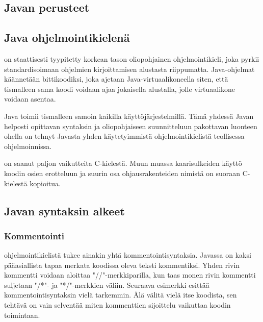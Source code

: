 \documentclass[a4paper,justified,notoc]{tufte-book}
\begin{document}
\begin{fullwidth}

\chapter{Javan perusteet}
\label{perusteet}	

\section{Java ohjelmointikielenä}
\label{javasta}

 on staattisesti tyypitetty korkean tason oliopohjainen ohjelmointikieli, joka
pyrkii standardisoimaan ohjelmien kirjoittamisen alustasta riippumatta. Java-ohjelmat käännetään
bittikoodiksi, joka ajetaan Java-virtuaalikoneella siten, että tismalleen sama koodi voidaan ajaa
jokaisella alustalla, jolle virtuaalikone voidaan asentaa.

 Java toimii tismalleen samoin kaikilla käyttöjärjestelmillä. Tämä
yhdessä Javan helposti opittavan syntaksin ja oliopohjaiseen suunnitteluun pakottavan luonteen
ohella on tehnyt Javasta yhden käytetyimmistä ohjelmointikielistä teollisessa ohjelmoinnissa.

 on saanut paljon vaikutteita C-kielestä. Muun muassa kaarisulkeiden
käyttö koodin osien erotteluun ja suurin osa ohjausrakenteiden nimistä on suoraan C-kielestä
kopioitua.


\section{Javan syntaksin alkeet}
\label{syntaksin alkeista}

\subsection{Kommentointi}
\label{kommentointi}

 ohjelmointikielistä tukee ainakin yhtä kommentointisyntaksia. Javassa on
kaksi pääasiallista tapaa merkata koodissa oleva teksti kommentiksi. Yhden rivin kommentti voidaan
aloittaa "//"-merkkiparilla, kun taas monen rivin kommentti suljetaan "/*"- ja "*/"-merkkien
väliin. Seuraava esimerkki esittää kommentointisyntaksin vielä tarkemmin. Älä välitä vielä itse
koodista, sen tehtävä on vain selventää miten kommenttien sijoittelu vaikuttaa koodin toimintaan.


\end{fullwidth}
\end{document}
